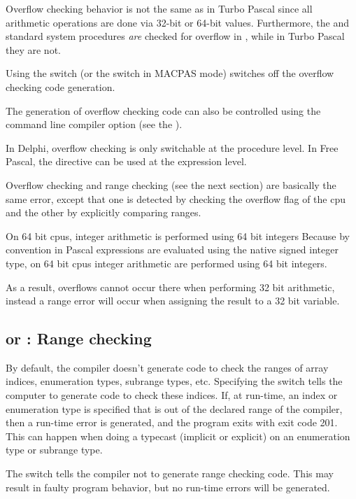 \begin{remark}
Overflow checking behavior is not the same as in
Turbo Pascal since all arithmetic operations are done via 32-bit or
64-bit values. Furthermore, the  and  standard system
procedures {\em are} checked for overflow in \fpc, while in Turbo
Pascal they are not.
\end{remark}
Using the  switch (or the  switch in MACPAS mode) switches off the overflow
checking code generation.

The generation of overflow checking code can also be controlled
using the  command line compiler option (see the \userref).

In Delphi, overflow checking is only switchable at the procedure level. 
In Free Pascal, the  directive can be used at the expression level.

\begin{remark}
Overflow checking and range checking (see the next section) are basically the same error, 
except that one is detected by checking the overflow flag of the cpu and the other by 
explicitly comparing ranges.

On 64 bit cpus, integer arithmetic is performed using 64 bit integers 
Because by convention in Pascal expressions are evaluated using the native signed integer
type, on 64 bit cpus integer arithmetic are performed using 64 bit integers. 
 
As a result, overflows cannot occur there when performing 32 bit arithmetic,
instead a range error will occur when assigning the result to a 32 bit variable.
\end{remark}

\subsection{ or  : Range checking}

By default, the compiler doesn't generate code to check the ranges of array
indices, enumeration types, subrange types, etc. Specifying the
 switch tells the computer to generate code to check these
indices. If, at run-time, an index or enumeration type is specified that is
out of the declared range of the compiler, then a run-time error is
generated, and the program exits with exit code 201. This can happen when
doing a typecast (implicit or explicit) on an enumeration type or subrange
type.

The  switch tells the compiler not to generate range checking
code. This may result in faulty program behavior, but no run-time errors
will be generated.

